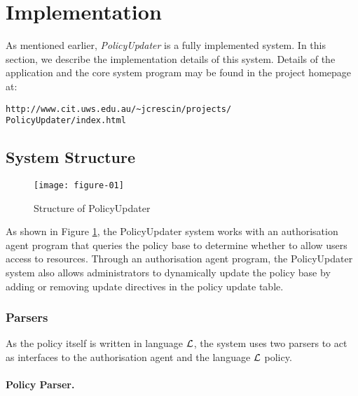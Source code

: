 \documentclass[glov2,twocolumn,final]{svjour2}
\newenvironment{vquote}
  {\begin{list}{}{\leftmargin 1em}\item[]}
  {\end{list}}
\begin{document}
  \section{Implementation}
    \label{sec-implement}

    As mentioned earlier, {\em PolicyUpdater} is a fully implemented system.
    In this section, we describe the implementation details of this system.
    Details of the application and the core system program may be found in
    the project homepage at:

    \begin{vquote}
      {\tt\scriptsize http://www.cit.uws.edu.au/\~{}jcrescin/projects/} \\
      {\tt\scriptsize PolicyUpdater/index.html}
    \end{vquote}

    \subsection{System Structure}

    \begin{figure}[ht]
      \begin{center}
        \texttt{[image: figure-01]}
        \caption{Structure of PolicyUpdater}
        \label{fig-1}
      \end{center}
    \end{figure}

      As shown in Figure \ref{fig-1}, the PolicyUpdater system works with an
      authorisation agent program that queries the policy base to determine
      whether to allow users access to resources. Through an authorisation
      agent program, the PolicyUpdater system also allows administrators to
      dynamically update the policy base by adding or removing update
      directives in the policy update table.

      \subsubsection{Parsers}

        As the policy itself is written in language ${\cal L}$, the system uses
        two parsers to act as interfaces to the authorisation agent and
        the language ${\cal L}$ policy.

        \paragraph{Policy Parser.}
\end{document}
